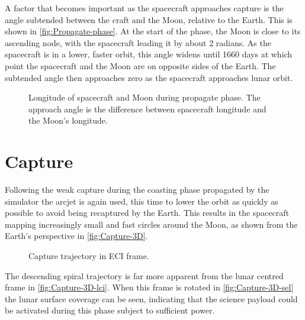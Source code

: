 A factor that becomes important as the spacecraft approaches capture is the angle subtended between the craft and the Moon, relative to the Earth. This is shown in \autoref{fig:Propagate-phase}. At the start of the phase, the Moon is close to its ascending node, with the spacecraft leading it by about 2 radians. As the spacecraft is in a lower, faster orbit, this angle widens until 1660 days at which point the spacecraft and the Moon are on opposite sides of the Earth. The subtended angle then approaches zero as the spacecraft approaches lunar orbit.

\begin{figure}
\caption{Longitude of spacecraft and Moon during propagate phase. The approach angle is the difference between spacecraft longitude and the Moon's longitude.} \label{fig:Propagate-phase}
\centering
\def\svgwidth{\figurewidth}

\end{figure}


\clearpage


\section{Capture} \label{sec:Capture}

Following the weak capture during the coasting phase propagated by the simulator the arcjet is again used, this time to lower the orbit as quickly as possible to avoid being recaptured by the Earth. This results in the spacecraft mapping increasingly small and fast circles around the Moon, as shown from the Earth's perspective in \autoref{fig:Capture-3D}.

\begin{figure}
\caption{Capture trajectory in ECI frame.} \label{fig:Capture-3D}
\centering
\def\svgwidth{\figurewidth}

\end{figure}

The descending spiral trajectory is far more apparent from the lunar centred frame in \autoref{fig:Capture-3D-lci}. When this frame is rotated in \autoref{fig:Capture-3D-sel} the lunar surface coverage can be seen, indicating that the science payload could be activated during this phase subject to sufficient power.

